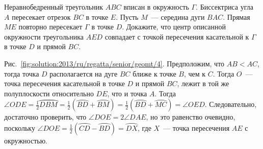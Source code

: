 \problem
Неравнобедренный треугольник $ABC$ вписан в окружность $\Gamma$.
Биссектриса угла $A$ пересекает отрезок $BC$ в точке $E$.
Пусть $M$~--- середина дуги $BAC$.
Прямая $ME$ повторно пересекает $\Gamma$ в точке $D$.
Докажите, что центр описанной окружности треугольника $AED$ совпадает с точкой
пересечения касательной к $\Gamma$ в точке $D$ и прямой $BC$.

%
\label{solution:2013/ru/regatta/senior/geomt/4}%
Рис.~\ref{fig:solution:2013/ru/regatta/senior/geomt/4}.
Предположим, что $AB < AC$, тогда точка $D$ располагается на дуге $BC$ ближе к
точке $B$, чем к $C$.
Тогда $O$~--- точка пересечения касательной в точке $D$ и прямой $BC$, лежит в
той же полуплоскости относительно $DE$, что и точка $A$.
Тогда
\(
    \angle ODE
=
    \frac{1}{2} \wideparen{DBM}
=
    \frac{1}{2}(\wideparen{BD} + \wideparen{BM})
=
    \frac{1}{2} (\wideparen{BD} + \wideparen{MC})
=
    \angle OED
\).
Следовательно, достаточно проверить, что $\angle DOE = 2\angle DAE$, но это
равенство очевидно, поскольку
$\angle DOE = \frac{1}{2} (\wideparen{CD}-\wideparen{BD}) = \wideparen{DX}$,
где $X$~--- точка пересечения $AE$ с окружностью.
\endproblem
